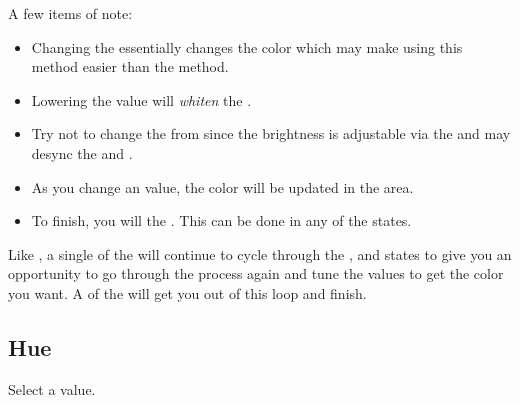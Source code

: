 \par\medskip

A few items of note:

\begin{itemize}
  \item Changing the  essentially changes the color which may make
    using this method easier than the  method.
  \item Lowering the  value will \textit{whiten} the .
  \item Try not to change the  from  since the
    brightness is adjustable via the  and may desync the  and
    .
  \item As you change an  value, the color will be updated in the
     area.
  \item To finish, you will  the .  This can be done
    in any of the  states.
\end{itemize}

Like , a single  of the  will continue to cycle through
the ,  and  states to give you an opportunity to go
through the process again and tune the values to get the color you want.  A
 of the  will get you out of this loop and finish.

\par\medskip



\subsection{Hue} 

Select a  value.

\par\medskip


